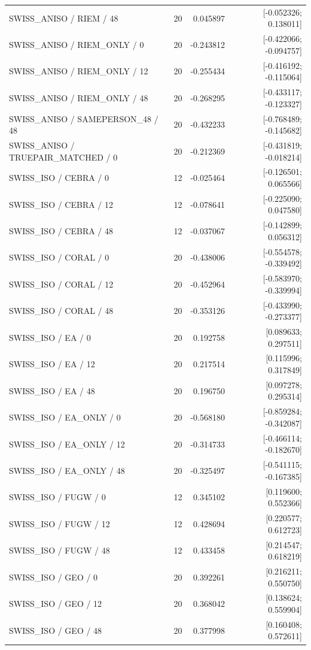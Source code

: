 \begin{longtable}{p{.56\linewidth}rrr}
SWISS\_ANISO / RIEM / 48 & 20 & 0.045897 & [-0.052326; 0.138011] \\
SWISS\_ANISO / RIEM\_ONLY / 0 & 20 & -0.243812 & [-0.422066; -0.094757] \\
SWISS\_ANISO / RIEM\_ONLY / 12 & 20 & -0.255434 & [-0.416192; -0.115064] \\
SWISS\_ANISO / RIEM\_ONLY / 48 & 20 & -0.268295 & [-0.433117; -0.123327] \\
SWISS\_ANISO / SAMEPERSON\_48 / 48 & 20 & -0.432233 & [-0.768489; -0.145682] \\
SWISS\_ANISO / TRUEPAIR\_MATCHED / 0 & 20 & -0.212369 & [-0.431819; -0.018214] \\
SWISS\_ISO / CEBRA / 0 & 12 & -0.025464 & [-0.126501; 0.065566] \\
SWISS\_ISO / CEBRA / 12 & 12 & -0.078641 & [-0.225090; 0.047580] \\
SWISS\_ISO / CEBRA / 48 & 12 & -0.037067 & [-0.142899; 0.056312] \\
SWISS\_ISO / CORAL / 0 & 20 & -0.438006 & [-0.554578; -0.339492] \\
SWISS\_ISO / CORAL / 12 & 20 & -0.452964 & [-0.583970; -0.339994] \\
SWISS\_ISO / CORAL / 48 & 20 & -0.353126 & [-0.433990; -0.273377] \\
SWISS\_ISO / EA / 0 & 20 & 0.192758 & [0.089633; 0.297511] \\
SWISS\_ISO / EA / 12 & 20 & 0.217514 & [0.115996; 0.317849] \\
SWISS\_ISO / EA / 48 & 20 & 0.196750 & [0.097278; 0.295314] \\
SWISS\_ISO / EA\_ONLY / 0 & 20 & -0.568180 & [-0.859284; -0.342087] \\
SWISS\_ISO / EA\_ONLY / 12 & 20 & -0.314733 & [-0.466114; -0.182670] \\
SWISS\_ISO / EA\_ONLY / 48 & 20 & -0.325497 & [-0.541115; -0.167385] \\
SWISS\_ISO / FUGW / 0 & 12 & 0.345102 & [0.119600; 0.552366] \\
SWISS\_ISO / FUGW / 12 & 12 & 0.428694 & [0.220577; 0.612723] \\
SWISS\_ISO / FUGW / 48 & 12 & 0.433458 & [0.214547; 0.618219] \\
SWISS\_ISO / GEO / 0 & 20 & 0.392261 & [0.216211; 0.550750] \\
SWISS\_ISO / GEO / 12 & 20 & 0.368042 & [0.138624; 0.559904] \\
SWISS\_ISO / GEO / 48 & 20 & 0.377998 & [0.160408; 0.572611] \\

\end{longtable}
